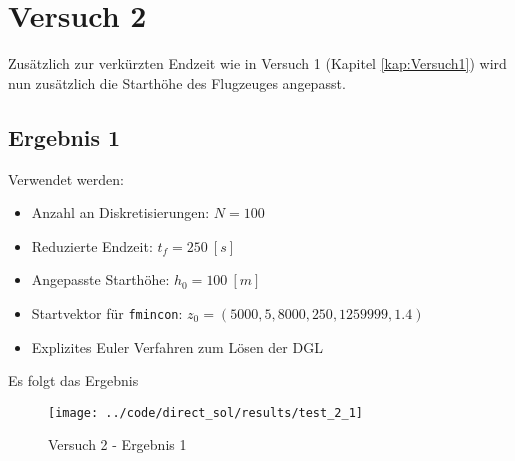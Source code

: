 














\newpage
\section{Versuch 2}
Zusätzlich zur verkürzten Endzeit wie in Versuch 1 (Kapitel \ref{kap:Versuch1}) wird nun zusätzlich die Starthöhe des Flugzeuges angepasst.

\subsection{Ergebnis 1}
Verwendet werden:
\begin{itemize}
\item Anzahl an Diskretisierungen: $N = 100$ 
\item Reduzierte Endzeit: $t_f = 250 \ [s]$
\item Angepasste Starthöhe: $h_0 = 100 \ [m]$
\item Startvektor für \texttt{fmincon}: $z_0 = (5000,5,8000,250,1259999,1.4)$
\item Explizites Euler Verfahren zum Lösen der DGL
\end{itemize}
Es folgt das Ergebnis
\begin{figure}[H]
\begin{center}
\texttt{[image: ../code/direct\_sol/results/test\_2\_1]}
\caption{Versuch 2 - Ergebnis 1}\label{img:test_2_1}
\end{center}
\end{figure}

